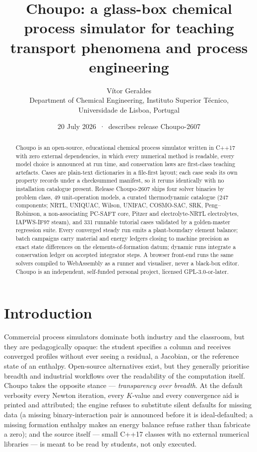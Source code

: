 \documentclass[11pt,a4paper]{article}
\title{Choupo: a glass-box chemical process simulator for teaching
       transport phenomena and process engineering}
\author{Vítor Geraldes\\[2pt]
  \small Department of Chemical Engineering, Instituto Superior Técnico,\\
  \small Universidade de Lisboa, Portugal}
\date{20 July 2026 \,·\, describes release Choupo-2607}
\begin{document}
\maketitle

\begin{abstract}
Choupo is an open-source, educational chemical process simulator written in
C++17 with zero external dependencies, in which every numerical method is
readable, every model choice is announced at run time, and conservation
laws are first-class teaching artefacts.  Cases are plain-text
dictionaries in a file-first layout; each case seals its own property
records under a checksummed manifest, so it reruns identically with no
installation catalogue present.  Release Choupo-2607 ships four solver
binaries by problem class, 49 unit-operation models, a curated
thermodynamic catalogue (247 components; NRTL, UNIQUAC, Wilson, UNIFAC,
COSMO-SAC, SRK, Peng--Robinson, a non-associating PC-SAFT core, Pitzer and
electrolyte-NRTL electrolytes, IAPWS-IF97 steam), and 331 runnable
tutorial cases validated by a golden-master regression suite.  Every
converged steady run emits a plant-boundary element balance; batch
campaigns carry material and energy ledgers closing to machine precision
as exact state differences on the elements-of-formation datum; dynamic
runs integrate a conservation ledger on accepted integrator steps.  A
browser front-end runs the same solvers compiled to WebAssembly as a
runner and visualiser, never a black-box editor.  Choupo is an
independent, self-funded personal project, licensed GPL-3.0-or-later.
\end{abstract}

\section{Introduction}

Commercial process simulators dominate both industry and the classroom,
but they are pedagogically opaque: the student specifies a column and
receives converged profiles without ever seeing a residual, a Jacobian, or
the reference state of an enthalpy.  Open-source alternatives exist, but
they generally prioritise breadth and industrial workflows over the
readability of the computation itself.  Choupo takes the opposite stance
--- \emph{transparency over breadth}.  At the default verbosity every
Newton iteration, every $K$-value and every convergence aid is printed and
attributed; the engine refuses to substitute silent defaults for missing
data (a missing binary-interaction pair is announced before it is
ideal-defaulted; a missing formation enthalpy makes an energy balance
refuse rather than fabricate a zero); and the source itself --- small
C++17 classes with no external numerical libraries --- is meant to be
read by students, not only executed.
\end{document}
